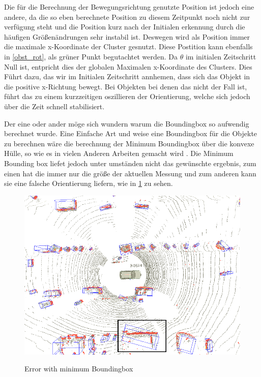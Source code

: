 \documentclass[11pt,oneside,openright]{mpreport}
\begin{document}
Die für die Berechnung der Bewegungsrichtung genutzte Position ist jedoch eine andere, da die so eben berechnete Position zu diesem Zeitpunkt noch nicht zur verfügung steht und
die Position kurz nach der Initialen erkennung durch die häufigen Größenändrungen sehr instabil ist. Deswegen wird als Position immer die maximale x-Koordinate der Cluster gesnutzt.
Diese Postition kann ebenfalls in \cref{obst_rot}, als grüner Punkt begutachtet werden.
Da $\theta$ im initialen Zeitschritt Null ist, entpricht dies der globalen Maximalen x-Koordinate des Clusters. Dies Führt dazu, das wir im Initialen Zeitschritt annhemen, dass sich das Objekt
in die positive x-Richtung bewegt. Bei Objekten bei denen das nicht der Fall ist, führt das zu einem kurzzeitigen oszillieren der Orientierung, welche sich jedoch über die Zeit schnell stabilisiert.


Der eine oder ander möge sich wundern warum die Boundingbox so aufwendig berechnet wurde. Eine Einfache Art und weise eine Boundingbox für die Objekte zu berechnen wäre die berechnung
der Minimum Boundingbox über die konvexe Hülle, so wie es in vielen Anderen Arbeiten gemacht wird \cite{Zhang,Himmelsbach2009}. Die Minimum Bounding box liefet jedoch unter umständen nicht das gewünschte
ergebnis, zum einen hat die immer nur die größe der aktuellen Messung und zum anderen kann sie eine falsche Orientierung liefern, wie in \cref{min_box} zu sehen.

\begin{figure}[!ht]
\caption{Error with minimum Boundingbox \cite{Himmelsbach2009}}
\includegraphics[width=\textwidth]{bilder/min_bound.png}
\label{min_box}
\end{figure}
\end{document}
